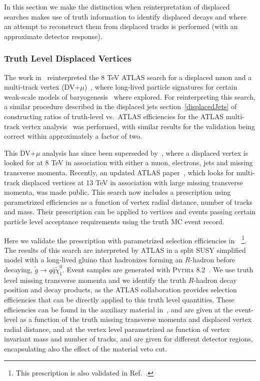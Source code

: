 In this section we make the distinction when reinterpretation of displaced searches makes use of truth information to identify displaced decays and where an attempt to reconstruct them from displaced tracks is performed (with an approximate detector response).

\subsubsection{Truth Level Displaced Vertices}

The work in~\cite{Cui:2014twa} reinterpreted the 8 TeV ATLAS search for a displaced muon and a multi-track vertex (DV+$\mu$)~\cite{ATLAS-CONF-2013-092}, where long-lived particle signatures for certain weak-scale models of baryogenesis~\cite{Cui:2012jh,Cui:2013bta,Cui:2014twa} where explored. For reinterpreting this search, a similar procedure described in the displaced jets 
section~\ref{displacedJets} of constructing ratios of truth-level vs.~ATLAS efficiencies for the ATLAS multi-track vertex analysis~\cite{ATLAS-CONF-2013-092} was performed, with similar results for the validation being correct within approximately a factor of two. 

This DV+$\mu$ analysis has since been superseded by~\cite{Aad:2015rba}, where a displaced vertex is looked for at 8 TeV in association with either a muon, electrons, jets and missing transverse momenta. Recently, an updated ATLAS paper~\cite{Aaboud:2017iio}, which looks for multi-track displaced vertices at 13 TeV in association with large missing transverse momenta, was made public. This search now includes a prescription using parametrized efficiencies as a function of vertex radial distance, number of tracks and mass. Their prescription can be applied to vertices and events passing certain particle level acceptance requirements using the truth MC event record. 

Here we validate the prescription with parametrized selection efficiencies
in~\cite{Aaboud:2017iio}~\footnote{This prescription is also validated in
Ref.~\cite{LesHouches2017}.}. The results of this search are interpreted by ATLAS in a split SUSY simplified model with a long-lived gluino that hadronizes forming an $R$-hadron before decaying, $\tilde{g}\rightarrow q\bar{q}\tilde{\chi}^{0}_{1}$. Event samples are generated with \textsc{Pythia 8.2}~\cite{Sjostrand:2014zea}. We use truth level missing transverse momenta and we identify the truth $R$-hadron decay position and decay products, as the ATLAS collaboration provides selection efficiencies that can be directly applied to this truth level quantities. These efficiencies can be found in the auxiliary material in~\cite{SUSY-2016-08}, and are given at the event-level as a function of the truth missing transverse momenta and displaced vertex radial distance, and at the vertex level parametrized as function of vertex invariant mass and number of tracks, and are given for different detector regions, encapsulating also the effect of the material veto cut.

